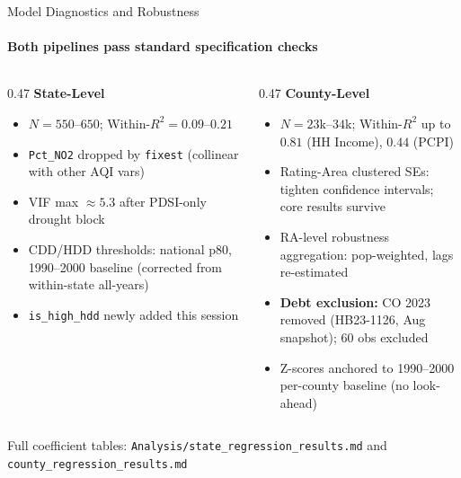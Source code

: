 \documentclass[aspectratio=169,11pt]{beamer}
\newcommand{\tealtext}[1]{{\color{Teal}#1}}
\newcommand{\graytext}[1]{{\color{WarmGray}#1}}
\begin{document}
\begin{frame}{Model Diagnostics and Robustness}
  \framesubtitle{Both pipelines pass standard specification checks}
  \begin{columns}[T]
    \begin{column}{0.47\textwidth}
      \textbf{\tealtext{State-Level}}
      \begin{itemize}\itemsep0.25em
        \item $N = 550$--$650$; Within-$R^2 = 0.09$--$0.21$
        \item \texttt{Pct\_NO2} dropped by \texttt{fixest} (collinear with other AQI vars)
        \item VIF max $\approx 5.3$ after PDSI-only drought block
        \item CDD/HDD thresholds: national p80, 1990--2000 baseline (corrected from within-state all-years)
        \item \texttt{is\_high\_hdd} newly added this session
      \end{itemize}
    \end{column}
    \begin{column}{0.47\textwidth}
      \textbf{\tealtext{County-Level}}
      \begin{itemize}\itemsep0.25em
        \item $N = 23$k--$34$k; Within-$R^2$ up to $0.81$ (HH Income), $0.44$ (PCPI)
        \item Rating-Area clustered SEs: tighten confidence intervals; core results survive
        \item RA-level robustness aggregation: pop-weighted, lags re-estimated
        \item \textbf{Debt exclusion:} CO 2023 removed (HB23-1126, Aug snapshot); $60$ obs excluded
        \item Z-scores anchored to 1990--2000 per-county baseline (no look-ahead)
      \end{itemize}
    \end{column}
  \end{columns}
  \vspace{0.4em}
  \begin{center}
    \graytext{\small Full coefficient tables: \texttt{Analysis/state\_regression\_results.md} and \texttt{county\_regression\_results.md}}
  \end{center}
\end{frame}
\end{document}
